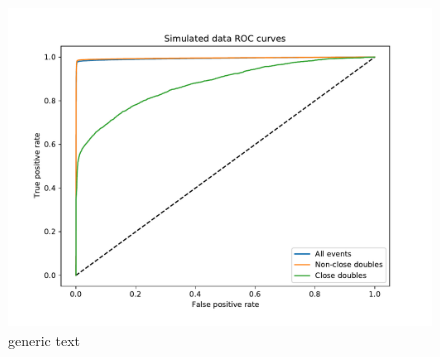 \begin{figure}
\centering
\includegraphics[width=0.8 \textwidth]{chapters/results/figures/roc_simulated.pdf}
\caption[Titletext]{generic text}\label{fig:roc_simulated}
\end{figure}
